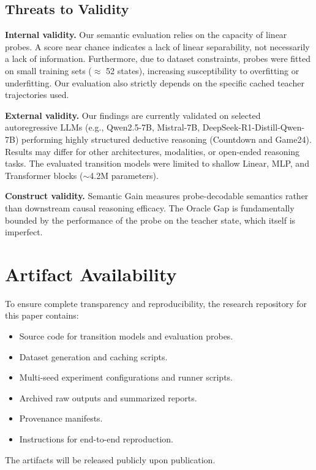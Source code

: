 \subsection{Threats to Validity}

\textbf{Internal validity.} Our semantic evaluation relies on the capacity of linear probes. A score near chance indicates a lack of linear separability, not necessarily a lack of information. Furthermore, due to dataset constraints, probes were fitted on small training sets ($\approx$ 52 states), increasing susceptibility to overfitting or underfitting. Our evaluation also strictly depends on the specific cached teacher trajectories used.

\textbf{External validity.} Our findings are currently validated on selected autoregressive LLMs (e.g., Qwen2.5-7B, Mistral-7B, DeepSeek-R1-Distill-Qwen-7B) performing highly structured deductive reasoning (Countdown and Game24). Results may differ for other architectures, modalities, or open-ended reasoning tasks. The evaluated transition models were limited to shallow Linear, MLP, and Transformer blocks ($\sim$4.2M parameters).

\textbf{Construct validity.} Semantic Gain measures probe-decodable semantics rather than downstream causal reasoning efficacy. The Oracle Gap is fundamentally bounded by the performance of the probe on the teacher state, which itself is imperfect.

\section{Artifact Availability}

To ensure complete transparency and reproducibility, the research repository for this paper contains:
\begin{itemize}
    \item Source code for transition models and evaluation probes.
    \item Dataset generation and caching scripts.
    \item Multi-seed experiment configurations and runner scripts.
    \item Archived raw outputs and summarized reports.
    \item Provenance manifests.
    \item Instructions for end-to-end reproduction.
\end{itemize}
The artifacts will be released publicly upon publication.

